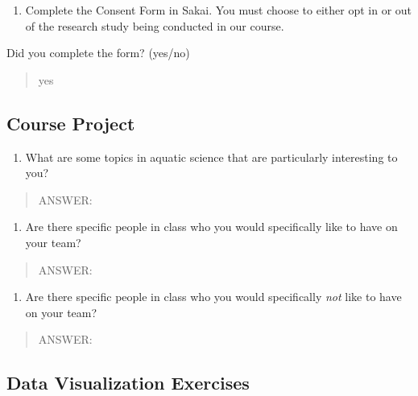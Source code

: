 \documentclass[]{article}
\providecommand{\tightlist}{%
  \setlength{\itemsep}{0pt}\setlength{\parskip}{0pt}}
\begin{document}
\begin{enumerate}
\def\labelenumi{\arabic{enumi}.}
\setcounter{enumi}{1}
\tightlist
\item
  Complete the Consent Form in Sakai. You must choose to either opt in
  or out of the research study being conducted in our course.
\end{enumerate}

Did you complete the form? (yes/no)

\begin{quote}
yes
\end{quote}

\hypertarget{course-project}{%
\subsection{Course Project}\label{course-project}}

\begin{enumerate}
\def\labelenumi{\arabic{enumi}.}
\setcounter{enumi}{2}
\tightlist
\item
  What are some topics in aquatic science that are particularly
  interesting to you?
\end{enumerate}

\begin{quote}
ANSWER:
\end{quote}

\begin{enumerate}
\def\labelenumi{\arabic{enumi}.}
\setcounter{enumi}{3}
\tightlist
\item
  Are there specific people in class who you would specifically like to
  have on your team?
\end{enumerate}

\begin{quote}
ANSWER:
\end{quote}

\begin{enumerate}
\def\labelenumi{\arabic{enumi}.}
\setcounter{enumi}{4}
\tightlist
\item
  Are there specific people in class who you would specifically
  \emph{not} like to have on your team?
\end{enumerate}

\begin{quote}
ANSWER:
\end{quote}

\hypertarget{data-visualization-exercises}{%
\subsection{Data Visualization
Exercises}\label{data-visualization-exercises}}
\end{document}
